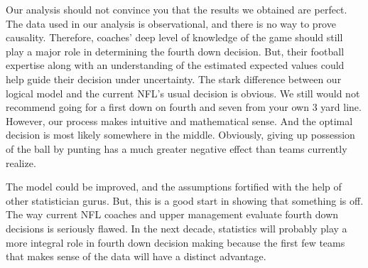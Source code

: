 \documentclass[letterpaper,10pt,english]{/anaconda/lib/python2.7/site-packages/sphinx/texinputs/sphinxhowto}
\begin{document}
Our analysis should not convince you that the results we obtained are
perfect. The data used in our analysis is observational, and there is no
way to prove causality. Therefore, coaches' deep level of knowledge of
the game should still play a major role in determining the fourth down
decision. But, their football expertise along with an understanding of
the estimated expected values could help guide their decision under
uncertainty. The stark difference between our logical model and the
current NFL's usual decision is obvious. We still would not recommend
going for a first down on fourth and seven from your own 3 yard line.
However, our process makes intuitive and mathematical sense. And the
optimal decision is most likely somewhere in the middle. Obviously,
giving up possession of the ball by punting has a much greater negative
effect than teams currently realize.

The model could be improved, and the assumptions fortified with the help
of other statistician gurus. But, this is a good start in showing that
something is off. The way current NFL coaches and upper management
evaluate fourth down decisions is seriously flawed. In the next decade,
statistics will probably play a more integral role in fourth down
decision making because the first few teams that makes sense of the data
will have a distinct advantage.
        

        \renewcommand{\indexname}{Index}
        \printindex

    
\end{document}

